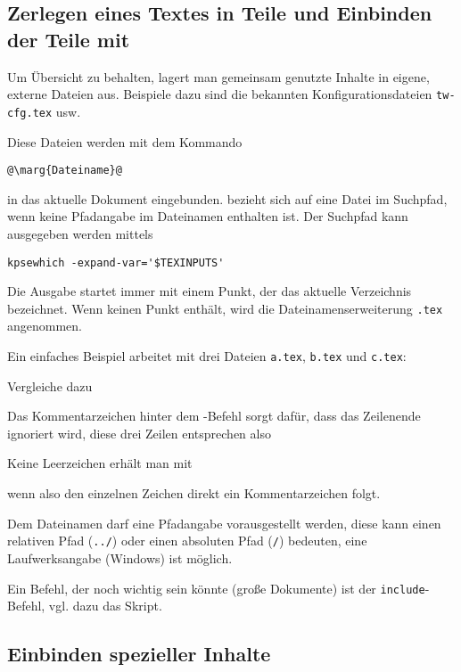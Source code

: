 \documentclass[ngerman,               %
               a4paper,               %
               fleqn,                 %
                     ]{scrartcl}       %
\begin{document}
\subsection[Zerlegen und Einbinden von Textteilen]{Zerlegen eines Textes in
  Teile und Einbinden der Teile mit }

Um Übersicht zu behalten, lagert man gemeinsam genutzte Inhalte in
eigene, externe Dateien aus. Beispiele dazu sind die bekannten
Konfigurationsdateien \texttt{tw-cfg.tex} usw.

Diese Dateien werden mit dem Kommando
\begin{lstlisting}
@\marg{Dateiname}@
\end{lstlisting}
in das aktuelle Dokument eingebunden.  bezieht sich
auf eine Datei im Suchpfad, wenn keine Pfadangabe im Dateinamen
enthalten ist. Der Suchpfad kann ausgegeben werden mittels
\begin{lstlisting}
kpsewhich -expand-var='$TEXINPUTS'
\end{lstlisting}
Die Ausgabe startet immer mit einem Punkt, der das aktuelle Verzeichnis
bezeichnet. Wenn  keinen Punkt enthält, wird die
Dateinamenserweiterung \texttt{.tex} angenommen.

Ein einfaches Beispiel arbeitet mit drei Dateien \texttt{a.tex},
\texttt{b.tex} und \texttt{c.tex}:





Vergleiche dazu

%
%


Das Kommentarzeichen hinter dem -Befehl sorgt dafür, dass
das Zeilenende ignoriert wird, diese drei Zeilen entsprechen also



Keine Leerzeichen erhält man mit



wenn also den einzelnen Zeichen direkt ein Kommentarzeichen folgt.

Dem Dateinamen darf eine Pfadangabe vorausgestellt werden, diese
kann einen relativen Pfad (\texttt{../}) oder einen absoluten Pfad
(\texttt{/}) bedeuten, eine Laufwerksangabe (Windows) ist möglich.

Ein Befehl, der noch wichtig sein könnte (große Dokumente) ist der
\lstinline|include|-Befehl, vgl. dazu das Skript.

\subsection{Einbinden spezieller Inhalte}
\end{document}
